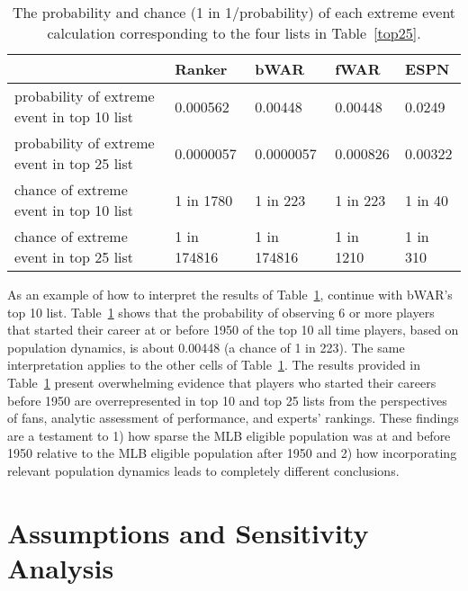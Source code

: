 \documentclass[11pt]{article}\usepackage[]{graphicx}\usepackage[]{color}
\begin{document}
\begin{table}[h!]
\begin{center}
\begin{tabular}{lllll}
\hline
  &  Ranker  &  bWAR  &  fWAR  &  ESPN \\
  \hline
probability of extreme event in top 10 list 
  & 0.000562 
  & 0.00448 
  & 0.00448 
  & 0.0249 \\
probability of extreme event in top 25 list 
  & 0.0000057 
  & 0.0000057 
  & 0.000826 
  & 0.00322 \\
chance of extreme event in top 10 list 
  & 1 in 1780 
  & 1 in 223 
  & 1 in 223 
  & 1 in 40 \\
chance of extreme event in top 25 list 
  & 1 in 174816 
  & 1 in 174816 
  & 1 in 1210 
  & 1 in 310 \\
  \hline
\end{tabular}
\end{center}
\caption{The probability and chance (1 in 1/probability) of each extreme event 
  calculation corresponding to the four lists in Table~\ref{top25}.}
\label{probvalues}
\end{table}

As an example of how to interpret the results of Table~\ref{probvalues}, 
continue with bWAR's top 10 list.  Table~\ref{probvalues} shows that the 
probability of observing 6 or more players that started their career at 
or before 1950 of the top 10 all time players, based on population 
dynamics, is about 0.00448 
(a chance of 1 in 223).
The same interpretation applies to the other cells of Table~\ref{probvalues}.  
The results provided in Table~\ref{probvalues} present overwhelming evidence 
that players who started their careers before 1950 are overrepresented in top 
10 and top 25 lists from the perspectives of fans, analytic assessment of 
performance, and experts' rankings.  These findings are a testament to 1) how 
sparse the MLB eligible population was at and before 1950 relative to the MLB 
eligible population after 1950 and 2) how incorporating relevant population 
dynamics leads to completely different conclusions.




\section{Assumptions and Sensitivity Analysis}
\label{sec:Assumptions}
\end{document}
